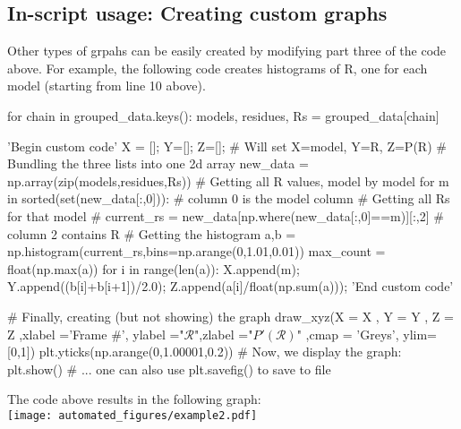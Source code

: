 \documentclass[fleqn,10pt,lineno]{wlpeerj} %
\begin{document}
\subsection*{In-script usage: Creating custom graphs}
Other types of grpahs can be easily created by modifying part three of the code above. 
For example, the following code creates histograms of R, one for each model (starting from line 10 above).
\begin{python}[firstnumber=10]
	for chain in grouped_data.keys():
		models, residues, Rs = grouped_data[chain]
		
		'Begin custom code'
		X = []; Y=[]; Z=[]; # Will set X=model, Y=R, Z=P(R)
		# Bundling the three lists into one 2d array
		new_data =  np.array(zip(models,residues,Rs))
		# Getting all R values, model by model
		for m in sorted(set(new_data[:,0])): # column 0 is the model column
			# Getting all Rs for that model #
			current_rs = new_data[np.where(new_data[:,0]==m)][:,2] # column 2 contains R
			# Getting the histogram
			a,b = np.histogram(current_rs,bins=np.arange(0,1.01,0.01))
			max_count = float(np.max(a))
			for i in range(len(a)):
				X.append(m); Y.append((b[i]+b[i+1])/2.0); Z.append(a[i]/float(np.sum(a)));
		'End custom code'
		
		# Finally, creating (but not showing) the graph 
		draw_xyz(X = X       ,      Y = Y  ,                Z = Z
		   ,xlabel ='Frame #', ylabel ="$\mathcal{R}$",zlabel ="$P'(\mathcal{R})$"
			 ,cmap = 'Greys', ylim=[0,1])
		plt.yticks(np.arange(0,1.00001,0.2))
		# Now, we display the graph:
		plt.show() # ... one can also use plt.savefig() to save to file
\end{python}
The code above results in the following graph:\\
\texttt{[image: automated\_figures/example2.pdf]}
\end{document}
